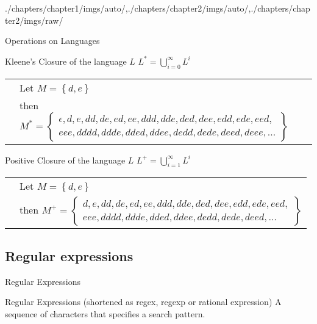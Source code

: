 \begin{graphicspathcontext}{{./chapters/chapter1/imgs/auto/},{./chapters/chapter2/imgs/auto/},{./chapters/chapter2/imgs/raw/}}
\begin{bibunit}[apalike]
\begin{frame}[c]{Operations on Languages \insertcontinuationtext}
	\begin{block}{Kleene's Closure of the language $L$}
		$L^* = \bigcup^{\infty}_{i=0}L^i$
		\begin{tabularx}{\linewidth}{@{}lX@{}}
		\insertexamplelabel & Let $M = \left\{ d, e \right\}$ \\
		& then $M^* = \left\{ \begin{array}{l}
			\scriptstyle \epsilon, d, e, dd, de, ed, ee, ddd, dde, ded, dee, edd, ede, eed, \\
			\scriptstyle eee, dddd, ddde, dded, ddee, dedd, dede, deed, deee, \dots\end{array} \right\}$
		\end{tabularx}
	\end{block}
	\vspace{.5cm}
	\begin{block}{Positive Closure of the language $L$}
		$L^+ = \bigcup^{\infty}_{i=1}L^i$
		\begin{tabularx}{\linewidth}{@{}lX@{}}
		\insertexamplelabel & Let $M = \left\{ d, e \right\}$ \\
		& then $M^+ = \left\{ \begin{array}{l}
			\scriptstyle d, e, dd, de, ed, ee, ddd, dde, ded, dee, edd, ede, eed, \\
			\scriptstyle eee, dddd, ddde, dded, ddee, dedd, dede, deed, \dots\end{array} \right\}$
		\end{tabularx}
	\end{block}
\end{frame}

\subsection{Regular expressions}
\subsectiontableofcontentslide

\begin{frame}{Regular Expressions}
	\begin{definitionblock}{Regular Expressions (shortened as regex, regexp or rational expression)}
		A sequence of characters that specifies a search pattern.
	\end{definitionblock}
	\vspace{.5cm}
	\begin{leftarrowsequence}
	\end{leftarrowsequence}
\end{frame}


\end{bibunit}
\end{graphicspathcontext}
